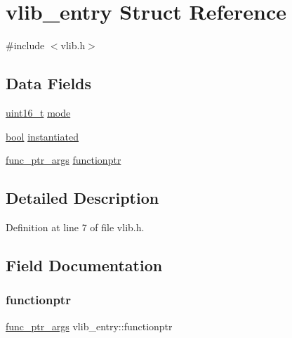 \hypertarget{a00266}{}\section{vlib\+\_\+entry Struct Reference}
\label{a00266}


{\ttfamily \#include $<$vlib.\+h$>$}

\subsection*{Data Fields}
\begin{DoxyCompactItemize}
\item 
\hyperlink{a00125_a273cf69d639a59973b6019625df33e30_a273cf69d639a59973b6019625df33e30}{uint16\+\_\+t} \hyperlink{a00266_a46df5a47ac05a46ce871e5132153949c_a46df5a47ac05a46ce871e5132153949c}{mode}
\item 
\hyperlink{a00125_af6a258d8f3ee5206d682d799316314b1_af6a258d8f3ee5206d682d799316314b1}{bool} \hyperlink{a00266_ab67e2f60e6622a2d0b7c8a3ac6fd7c71_ab67e2f60e6622a2d0b7c8a3ac6fd7c71}{instantiated}
\item 
\hyperlink{a00125_a7ec4af7c086c1f2c2a0e01fc23203a56_a7ec4af7c086c1f2c2a0e01fc23203a56}{func\+\_\+ptr\+\_\+args} \hyperlink{a00266_a5d194ce83e680c074ac0a0641af42be6_a5d194ce83e680c074ac0a0641af42be6}{functionptr}
\end{DoxyCompactItemize}


\subsection{Detailed Description}


Definition at line 7 of file vlib.\+h.



\subsection{Field Documentation}
\mbox{\label{a00266_a5d194ce83e680c074ac0a0641af42be6_a5d194ce83e680c074ac0a0641af42be6}} 
\subsubsection{\texorpdfstring{functionptr}{functionptr}}
{\footnotesize\ttfamily \hyperlink{a00125_a7ec4af7c086c1f2c2a0e01fc23203a56_a7ec4af7c086c1f2c2a0e01fc23203a56}{func\+\_\+ptr\+\_\+args} vlib\+\_\+entry\+::functionptr}



